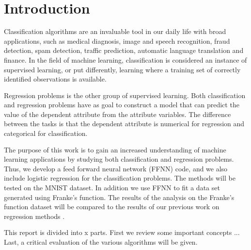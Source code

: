 \documentclass[../main.tex]{subfiles}
\begin{document}
\section{Introduction}
Classification algorithms are an invaluable tool in our daily life with broad applications, such as medical diagnosis, image and speech recognition, fraud detection, spam detection, traffic prediction, automatic language translation and finance. In the field of machine learning, classification is considered an instance of supervised learning, or put differently, learning where a training set of correctly identified observations is available.

Regression problems is the other group of supervised learning. Both classification and regression problems have as goal to construct a model that can predict the value of the dependent attribute from the attribute variables. The difference between the tasks is that the dependent attribute is numerical for regression and categorical for classification.

The purpose of this work is to gain an increased understanding of machine learning applications by studying both classification and regression problems. Thus, we develop a feed forward neural network (FFNN) code, and we also include logistic regression for the classification problems. The methods will be tested on the MNIST dataset. In addition we use FFNN to fit a data set generated using Franke’s function. The results of the analysis on the Franke's function dataset will be compared to the results of our previous work on regression methods \cite{project1}. 

This report is divided into x parts. First we review some important concepts ... Last, a critical evaluation of the various algorithms will be given. 
\end{document}
